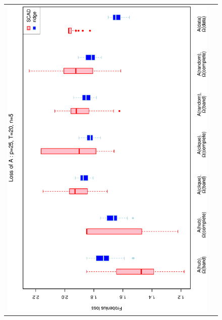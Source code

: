 \documentclass[a4paper]{article}
\begin{document}
\begin{figure}[h!]
\centering
\begin{tabular}{cc}
\includegraphics[scale=0.45,angle=270]{LossA25T20N5_5.eps}
\\

\end{tabular}
\end{figure}
\end{document}
